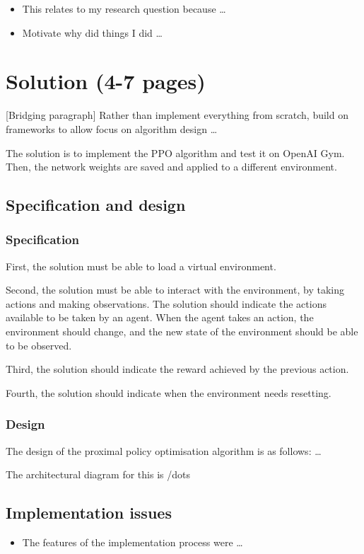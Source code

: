 \documentclass[12pt,a4paper]{article}
\begin{document}
\begin{itemize}
    \item This relates to my research question because \dots 
    \item Motivate why did things I did \dots
\end{itemize}
 
\section{Solution (4-7 pages)}
[Bridging paragraph] Rather than implement everything from scratch, build on frameworks to allow focus on algorithm design \dots

The solution is to implement the PPO algorithm and test it on OpenAI Gym. Then, the network weights are saved and applied to a different environment. 

\subsection{Specification and design}
\subsubsection{Specification}
First, the solution must be able to load a virtual environment. 

Second, the solution must be able to interact with the environment, by taking actions and making observations. The solution should indicate the actions available to be taken by an agent. When the agent takes an action, the environment should change, and the new state of the environment should be able to be observed.  

Third, the solution should indicate the reward achieved by the previous action.

Fourth, the solution should indicate when the environment needs resetting. 

\subsubsection{Design}
The design of the proximal policy optimisation algorithm is as follows: \dots 

The architectural diagram for this is /dots

\subsection{Implementation issues}
\begin{itemize}
    \item The features of the implementation process were \dots
\end{itemize}
\end{document}
